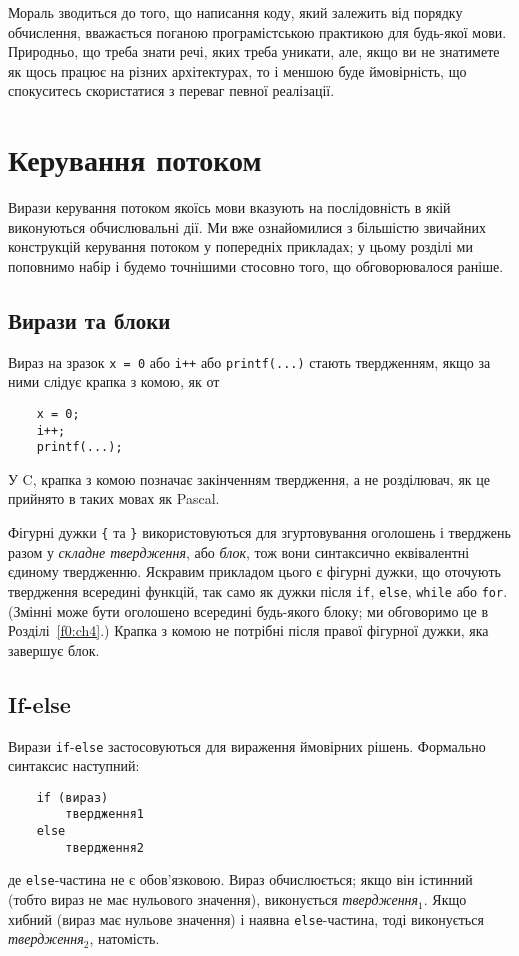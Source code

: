 \documentclass[a4paper,12pt]{book}
\begin{document}
  Мораль зводиться до того, що написання коду, який залежить від порядку обчислення,
  вважається поганою програмістською практикою для будь-якої мови. Природньо, що треба
  знати речі, яких треба уникати, але, якщо ви не знатимете як щось працює на різних
  архітектурах, то і меншою буде ймовірність, що спокуситесь скористатися з переваг
  певної реалізації.

\chapter{Керування потоком}

\label{f0:ch3}
  Вирази керування потоком якоїсь мови вказують на послідовність в якій виконуються
  обчислювальні дії. Ми вже ознайомилися з більшістю звичайних конструкцій керування
  потоком у попередніх прикладах; у цьому розділі ми поповнимо набір і будемо точнішими
  стосовно того, що обговорювалося раніше.

\section{Вирази та блоки}


  Вираз на зразок \texttt{x = 0} або \texttt{i++} або \texttt{printf(...)} стають
  твердженням, якщо за ними слідує крапка з комою, як от
  \begin{verbatim}
    x = 0;
    i++;
    printf(...);
  \end{verbatim}

  У C, крапка з комою позначає закінченням твердження, а не розділювач, як це прийнято
  в таких мовах як Pascal.

  Фігурні дужки \texttt{\{} та \texttt{\}} використовуються для згуртовування оголошень і
  тверджень разом у \textit{складне твердження}, або \textit{блок}, тож вони синтаксично
  еквівалентні єдиному твердженню. Яскравим прикладом цього є фігурні дужки, що оточують
  твердження всередині функцій, так само як дужки після \texttt{if}, \texttt{else},
  \texttt{while} або \texttt{for}. (Змінні може бути оголошено всередині будь-якого блоку;
  ми обговоримо це в Розділі~\ref{f0:ch4}.) Крапка з комою не потрібні після
  правої фігурної дужки, яка завершує блок.

\section{If-else}


  Вирази \texttt{if}-\texttt{else} застосовуються для вираження ймовірних рішень.
  Формально синтаксис наступний:
  \begin{verbatim}
    if (вираз)
        твердження1
    else
        твердження2
  \end{verbatim}
  де \texttt{else}-частина не є обов'язковою. Вираз обчислюється; якщо він істинний (тобто
  вираз не має нульового значення), виконується \textit{твердження\(_{1}\)}. Якщо хибний
  (вираз має нульове значення) і наявна \texttt{else}-частина, тоді виконується
  \textit{твердження\(_{2}\)}, натомість.
\end{document}
